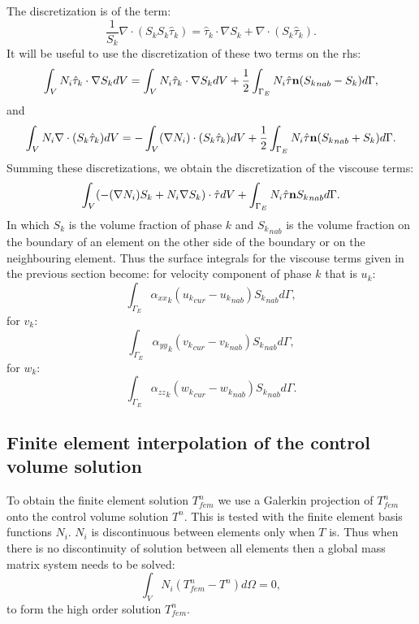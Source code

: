 The discretization is of the term:
 \begin{equation}
\frac{1}{S_k} \nabla \cdot (S_k S_k \hat\tau_k ) =
\hat\tau_k \cdot \nabla S_k + \nabla \cdot (S_k \hat\tau_k). 
\label{form-derivs-dg-visc}
\end{equation}
It will be useful to use the discretization of these two terms on the rhs:
 \begin{equation}
\int_V N_i \hat \tau_k \cdot \nabla S_k dV 
=\int_V N_i \hat \tau_k \cdot \nabla S_k dV 
+\frac{1}{2}\int_{\Gamma_E} N_i \hat\tau {\bf n} ( {S_k}_{nab} - S_k ) d\Gamma, 
\end{equation}
and 
 \begin{equation}
\int_V N_i \nabla \cdot (S_k \hat \tau_k)  dV 
=
- \int_V (\nabla N_i) \cdot (S_k \hat \tau_k)  dV 
+\frac{1}{2}\int_{\Gamma_E} N_i \hat\tau {\bf n} ( {S_k}_{nab} + S_k ) d\Gamma. 
\end{equation}
Summing these discretizations, we obtain the discretization of the viscouse terms: 
 \begin{equation}
\int_V (-(\nabla N_i)S_k + N_i \nabla S_k)\cdot \hat \tau dV 
+\int_{\Gamma_E} N_i \hat\tau {\bf n}  {S_k}_{nab}  d\Gamma. 
\end{equation}
In which $S_k$ is the volume fraction of phase $k$ and ${S_k}_{nab}$ is the 
volume fraction on the boundary of an element on the other side of the boundary or on the 
neighbouring element.  
Thus the surface integrals for the viscouse terms given in the previous section 
become: 
for velocity component of phase $k$ that is $u_k$:
\begin{equation}
\int_{\Gamma_E} {\alpha_{xx}}_k ({u_k}_{cur}-{u_k}_{nab}) {S_k}_{nab} d\Gamma,
\end{equation}
for $v_k$:
\begin{equation}
\int_{\Gamma_E} {\alpha_{yy}}_k ({v_k}_{cur}-{v_k}_{nab}) {S_k}_{nab} d\Gamma,
\end{equation}
for $w_k$:
\begin{equation}
\int_{\Gamma_E} {\alpha_{zz}}_k ({w_k}_{cur}-{w_k}_{nab}) {S_k}_{nab} d\Gamma. 
\end{equation}




\subsection{Finite element interpolation of the control volume solution} 
To obtain the finite element solution $T_{fem}^n$ we use a Galerkin projection of $T_{fem}^n$ onto the control volume solution $T^n$. This is tested with the finite element basis functions $N_i$. $N_i$ is discontinuous between elements only when $T$ is. Thus when there is no discontinuity of solution between all elements then a global mass matrix system needs to be solved:
 \begin{displaymath}
 \int_V N_i (T_{fem}^n- T^n) d\Omega =0, 
\end{displaymath}
to form the high order solution $T_{fem}^n$.  


